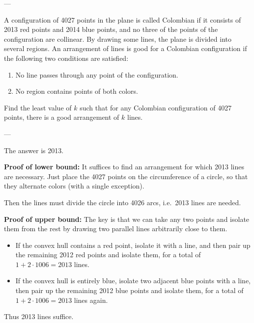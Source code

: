 
---

A configuration of 4027 points in the plane is called Colombian if it consists of 2013 red points and 2014 blue points, and no three of the points of the configuration are collinear. By drawing some lines, the plane is divided into several regions. An arrangement of lines is good for a Colombian configuration if the following two conditions are satisfied:
\begin{enumerate}[label=(\roman*),itemsep=0em]
    \item No line passes through any point of the configuration.
    \item No region contains points of both colors.
\end{enumerate}
Find the least value of $k$ such that for any Colombian configuration of 4027 points, there is a good arrangement of $k$ lines.

---

The answer is 2013.

\bigskip

\textbf{Proof of lower bound:} It suffices to find an arrangement for which 2013 lines are necessary. Just place the 4027 points on the circumference of a circle, so that they alternate colors (with a single exception).

Then the lines must divide the circle into 4026 arcs, i.e.\ 2013 lines are needed.

\bigskip

\textbf{Proof of upper bound:} The key is that we can take any two points and isolate them from the rest by drawing two parallel lines arbitrarily close to them.
\begin{itemize}
    \item If the convex hull contains a red point, isolate it with a line, and then pair up the remaining 2012 red points and isolate them, for a total of $1+2\cdot1006=2013$ lines.
    \item If the convex hull is entirely blue, isolate two adjacent blue points with a line, then pair up the remaining 2012 blue points and isolate them, for a total of $1+2\cdot1006=2013$ lines again.
\end{itemize}
Thus 2013 lines suffice.

